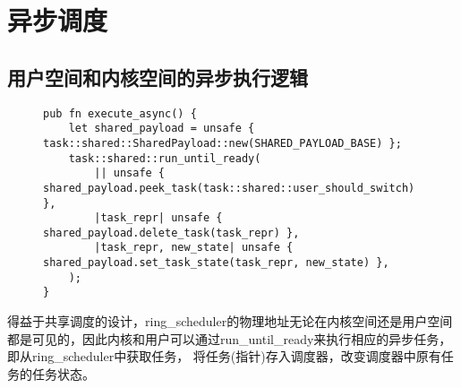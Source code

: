 \section{异步调度}

\subsection{用户空间和内核空间的异步执行逻辑}
\begin{figure}[h]
\begin{lstlisting}[caption=用户空间的异步逻辑]
pub fn execute_async() {
    let shared_payload = unsafe { task::shared::SharedPayload::new(SHARED_PAYLOAD_BASE) };
    task::shared::run_until_ready(
        || unsafe { shared_payload.peek_task(task::shared::user_should_switch) },
        |task_repr| unsafe { shared_payload.delete_task(task_repr) },
        |task_repr, new_state| unsafe { shared_payload.set_task_state(task_repr, new_state) },
    );
}
\end{lstlisting}
\end{figure}

得益于共享调度的设计，ring\_scheduler的物理地址无论在内核空间还是用户空间都是可见的，因此内核和用户可以通过run\_until\_ready来执行相应的异步任务， 即从ring\_scheduler中获取任务， 将任务(指针)存入调度器，改变调度器中原有任务的任务状态。



